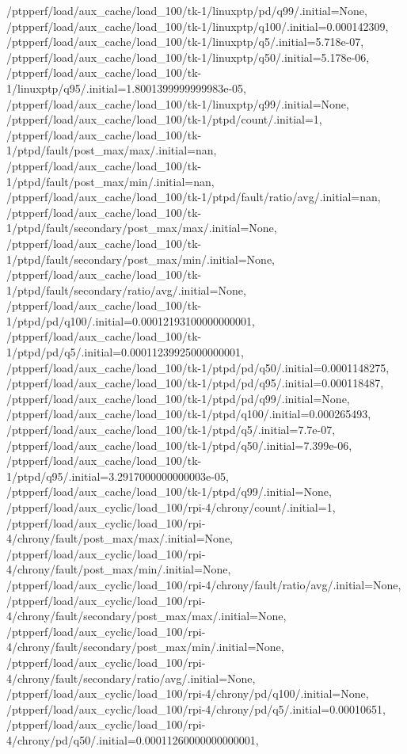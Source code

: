 {    /ptpperf/load/aux_cache/load_100/tk-1/linuxptp/pd/q99/.initial=None,
    /ptpperf/load/aux_cache/load_100/tk-1/linuxptp/q100/.initial=0.000142309,
    /ptpperf/load/aux_cache/load_100/tk-1/linuxptp/q5/.initial=5.718e-07,
    /ptpperf/load/aux_cache/load_100/tk-1/linuxptp/q50/.initial=5.178e-06,
    /ptpperf/load/aux_cache/load_100/tk-1/linuxptp/q95/.initial=1.8001399999999983e-05,
    /ptpperf/load/aux_cache/load_100/tk-1/linuxptp/q99/.initial=None,
    /ptpperf/load/aux_cache/load_100/tk-1/ptpd/count/.initial=1,
    /ptpperf/load/aux_cache/load_100/tk-1/ptpd/fault/post_max/max/.initial=nan,
    /ptpperf/load/aux_cache/load_100/tk-1/ptpd/fault/post_max/min/.initial=nan,
    /ptpperf/load/aux_cache/load_100/tk-1/ptpd/fault/ratio/avg/.initial=nan,
    /ptpperf/load/aux_cache/load_100/tk-1/ptpd/fault/secondary/post_max/max/.initial=None,
    /ptpperf/load/aux_cache/load_100/tk-1/ptpd/fault/secondary/post_max/min/.initial=None,
    /ptpperf/load/aux_cache/load_100/tk-1/ptpd/fault/secondary/ratio/avg/.initial=None,
    /ptpperf/load/aux_cache/load_100/tk-1/ptpd/pd/q100/.initial=0.00012193100000000001,
    /ptpperf/load/aux_cache/load_100/tk-1/ptpd/pd/q5/.initial=0.00011239925000000001,
    /ptpperf/load/aux_cache/load_100/tk-1/ptpd/pd/q50/.initial=0.0001148275,
    /ptpperf/load/aux_cache/load_100/tk-1/ptpd/pd/q95/.initial=0.000118487,
    /ptpperf/load/aux_cache/load_100/tk-1/ptpd/pd/q99/.initial=None,
    /ptpperf/load/aux_cache/load_100/tk-1/ptpd/q100/.initial=0.000265493,
    /ptpperf/load/aux_cache/load_100/tk-1/ptpd/q5/.initial=7.7e-07,
    /ptpperf/load/aux_cache/load_100/tk-1/ptpd/q50/.initial=7.399e-06,
    /ptpperf/load/aux_cache/load_100/tk-1/ptpd/q95/.initial=3.2917000000000003e-05,
    /ptpperf/load/aux_cache/load_100/tk-1/ptpd/q99/.initial=None,
    /ptpperf/load/aux_cyclic/load_100/rpi-4/chrony/count/.initial=1,
    /ptpperf/load/aux_cyclic/load_100/rpi-4/chrony/fault/post_max/max/.initial=None,
    /ptpperf/load/aux_cyclic/load_100/rpi-4/chrony/fault/post_max/min/.initial=None,
    /ptpperf/load/aux_cyclic/load_100/rpi-4/chrony/fault/ratio/avg/.initial=None,
    /ptpperf/load/aux_cyclic/load_100/rpi-4/chrony/fault/secondary/post_max/max/.initial=None,
    /ptpperf/load/aux_cyclic/load_100/rpi-4/chrony/fault/secondary/post_max/min/.initial=None,
    /ptpperf/load/aux_cyclic/load_100/rpi-4/chrony/fault/secondary/ratio/avg/.initial=None,
    /ptpperf/load/aux_cyclic/load_100/rpi-4/chrony/pd/q100/.initial=None,
    /ptpperf/load/aux_cyclic/load_100/rpi-4/chrony/pd/q5/.initial=0.00010651,
    /ptpperf/load/aux_cyclic/load_100/rpi-4/chrony/pd/q50/.initial=0.00011260000000000001,
}
